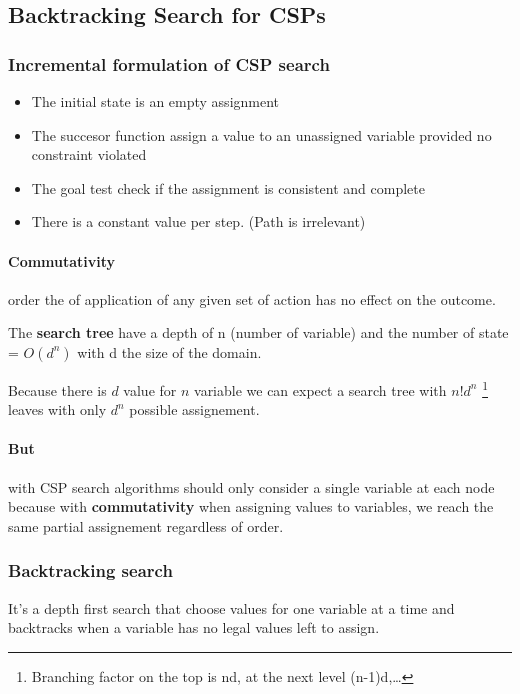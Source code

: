 \subsection{Backtracking Search for CSPs}

\subsubsection{Incremental formulation of CSP search }
\begin{itemize}
	\item The initial state is an empty assignment
	\item The succesor function assign a value to an unassigned variable provided no constraint violated
	\item The goal test check if the assignment is consistent and complete
	\item There is a constant value per step. (Path is irrelevant)
\end{itemize}

    
\paragraph{Commutativity} order the of application  of any given set of
action has no effect on the outcome.  

The \textbf{search tree} have a depth  of n (number of variable) and the
number of  state =  $O(d^n)$ with  d the  size of  the domain.  

Because there is $d$ value for $n$  variable we can expect a search tree
with $n! d^n$  \footnote{Branching factor on the top is  nd, at the next
level (n-1)d,\ldots} leaves with only $d^n$ possible assignement.

\paragraph{\textbf{But}} with CSP search algorithms should only consider
a single variable at each  node because with \textbf{commutativity} when
assigning values  to variables,  we reach  the same  partial assignement
regardless of order. 


\subsubsection{Backtracking search}  It's a  depth first search  that choose
values for one variable at a time  and backtracks when a variable has no
legal values left  to assign. 

